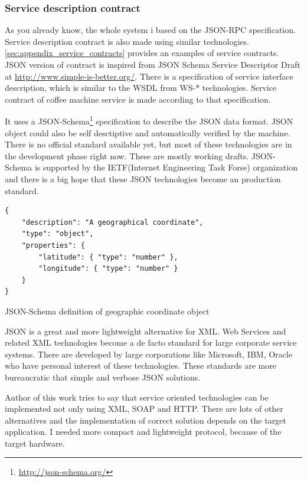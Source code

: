 \subsubsection{Service description contract}
\label{sec:service_json_contract}

As you already know, the whole system i based on the JSON-RPC specification.
Service description contract is also made using similar technologies.
\autoref{sec:appendix_service_contracts} provides an examples of service contracts.
JSON version of contract is inspired from JSON Schema Service Descriptor Draft at \url{http://www.simple-is-better.org/}.
There is a specification of service interface description, which is similar to the \gls{WSDL} from WS-* technologies. 
Service contract of coffee machine service is made according to that specification.

It uses a JSON-Schema\footnote{\url{http://json-schema.org/}} specification to describe the JSON data format. 
JSON object could also be self desctiptive and automatically verified by the machine.
There is no official standard available yet, but most of these technologies are in the development phase right now. 
These are mostly working drafts.
JSON-Schema is supported by the IETF(Internet Engineering Task Forse) organization and there is a big hope that these JSON technologies become an production standard.


\begin{listing}[h]
\begin{verbatim}
{
    "description": "A geographical coordinate",
    "type": "object",
    "properties": {
        "latitude": { "type": "number" },
        "longitude": { "type": "number" }
    }
}
\end{verbatim}
\caption{JSON-Schema definition of geographic coordinate object}
\label{lst:json_schema_geo}
\end{listing}

JSON is a great and more lightweight alternative for XML.
Web Services and related XML technologies become a de facto standard for large corporate service systems. 
There are developed by large corporations like Microsoft, IBM, Oracle who have personal interest of these technologies.
These standards are more bureaucratic that simple and verbose JSON solutions. 

Author of this work tries to say that service oriented technologies can be implemented not only using XML, SOAP and HTTP.
There are lots of other alternatives and the implementation of correct solution
depends on the target application.
I needed more compact and lightweight protocol, because of the target hardware. 

